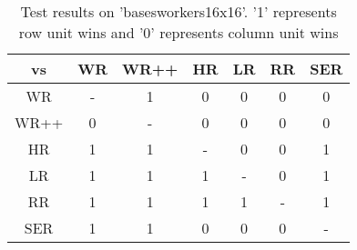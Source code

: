 \begin{table}[h]
    \centering
    \caption{Test results on 'basesworkers16x16'. '1' represents row unit wins and '0' represents column unit wins}
    \label{table:basesworkers16x16}
    \begin{tabular}{c|cccccc}
        \toprule
        vs & WR & WR++ & HR & LR & RR & SER \\
        \midrule
        WR          & - & 1 & 0 & 0 & 0 & 0 \\
        WR++  & 0 & - & 0 & 0 & 0 & 0 \\
        HR           & 1 & 1 & - & 0 & 0 & 1 \\
        LR           & 1 & 1 & 1 & - & 0 & 1 \\
        RR          & 1 & 1 & 1 & 1 & - & 1 \\
        SER  & 1 & 1 & 0 & 0 & 0 & - \\
        \bottomrule
    \end{tabular}
\end{table}
